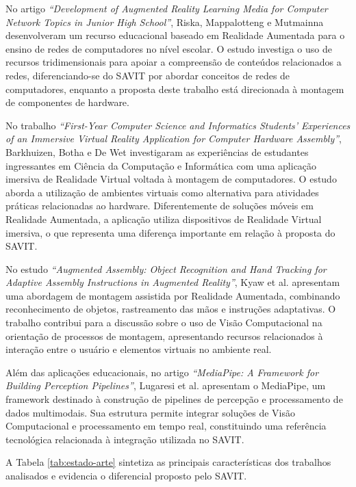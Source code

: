 \documentclass[11pt,a4paper]{article}
\begin{document}
No artigo \textit{``Development of Augmented Reality Learning Media for Computer Network Topics in Junior High School''}, Riska, Mappalotteng e Mutmainna \cite{galy2026} desenvolveram um recurso educacional baseado em Realidade Aumentada para o ensino de redes de computadores no nível escolar. O estudo investiga o uso de recursos tridimensionais para apoiar a compreensão de conteúdos relacionados a redes, diferenciando-se do SAVIT por abordar conceitos de redes de computadores, enquanto a proposta deste trabalho está direcionada à montagem de componentes de hardware.

No trabalho \textit{``First-Year Computer Science and Informatics Students' Experiences of an Immersive Virtual Reality Application for Computer Hardware Assembly''}, Barkhuizen, Botha e De Wet \cite{barkhuizen2026} investigaram as experiências de estudantes ingressantes em Ciência da Computação e Informática com uma aplicação imersiva de Realidade Virtual voltada à montagem de computadores. O estudo aborda a utilização de ambientes virtuais como alternativa para atividades práticas relacionadas ao hardware. Diferentemente de soluções móveis em Realidade Aumentada, a aplicação utiliza dispositivos de Realidade Virtual imersiva, o que representa uma diferença importante em relação à proposta do SAVIT.

No estudo \textit{``Augmented Assembly: Object Recognition and Hand Tracking for Adaptive Assembly Instructions in Augmented Reality''}, Kyaw et al. \cite{kyaw2026} apresentam uma abordagem de montagem assistida por Realidade Aumentada, combinando reconhecimento de objetos, rastreamento das mãos e instruções adaptativas. O trabalho contribui para a discussão sobre o uso de Visão Computacional na orientação de processos de montagem, apresentando recursos relacionados à interação entre o usuário e elementos virtuais no ambiente real.

Além das aplicações educacionais, no artigo \textit{``MediaPipe: A Framework for Building Perception Pipelines''}, Lugaresi et al. \cite{lugaresi2019} apresentam o MediaPipe, um framework destinado à construção de pipelines de percepção e processamento de dados multimodais. Sua estrutura permite integrar soluções de Visão Computacional e processamento em tempo real, constituindo uma referência tecnológica relacionada à integração utilizada no SAVIT.

A Tabela \ref{tab:estado-arte} sintetiza as principais características dos trabalhos analisados e evidencia o diferencial proposto pelo SAVIT.
\end{document}
